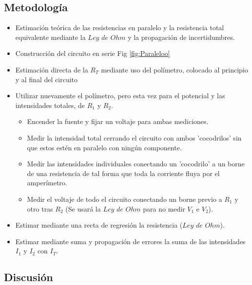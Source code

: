 \documentclass[11pt]{report}
\begin{document}
\begin{refsection}
\subsection{Metodología}

\begin{itemize}
    \item Estimación teórica de las resistencias en paralelo y la resistencia total equivalente mediante
    la $Ley$ $de$ $Ohm$ y la propagación de incertidumbres.
    \item Construcción del circuito en serie Fig \ref{fig:Paraleloo}
    \item Estimación directa de la $R_T$ mediante uso del polímetro, colocado al principio y al final del circuito 
    \item Utilizar nuevamente el polímetro, pero esta vez para el potencial y las intensidades totales, de $R_1$ y $R_2$.
    \begin{itemize}
        \item Encender la fuente y fijar un voltaje para ambas mediciones.
        \item Medir la intensidad total cerrando el circuito con ambos 'cocodrilos' sin que estos estén en paralelo con ningún componente.
        \item Medir las intensidades individuales conectando un 'cocodrilo' a un borne de una resistencia de tal forma que toda la corriente
        fluya por el amperímetro.
        \item Medir el voltaje de todo el circuito conectando un borne previo a $R_1$ y otro tras $R_2$  
        (Se usará la $Ley$ $de$ $Ohm$ para no medir $V_1$ e $V_2$).
    \end{itemize}
    \item Estimar mediante una recta de regresión la resistencia ($Ley$ $de$ $Ohm$).
    \item Estimar mediante suma y propagación de errores la suma de las intensidades $I_1$ y $I_2$ con $I_T$.
\end{itemize}

\subsection{Discusión}


\end{refsection}
\end{document}
